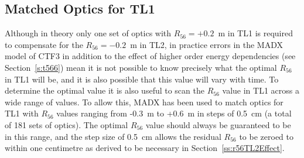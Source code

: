 
\subsection{Matched Optics for TL1}
\label{ss:tl1Optics}

Although in theory only one set of optics with \(R_{56} = +0.2\)~m in TL1 is required to compensate for the \(R_{56} = -0.2\)~m in TL2, in practice errors in the MADX model of CTF3 in addition to the effect of higher order energy dependencies (see Section~\ref{s:t566}) mean it is not possible to know precisely what the optimal \(R_{56}\) in TL1 will be, and it is also possible that this value will vary with time. To determine the optimal value it is also useful to scan the \(R_{56}\) value in TL1 across a wide range of values.%
To allow this, MADX has been used to match optics for TL1 with \(R_{56}\) values ranging from -0.3~m to +0.6~m in steps of 0.5~cm (a total of 181 sets of optics). The optimal \(R_{56}\) value should always be guaranteed to be in this range, and the step size of 0.5~cm allows the residual \(R_{56}\) to be zeroed to within one centimetre as derived to be necessary in Section~\ref{ss:r56TL2Effect}. 

